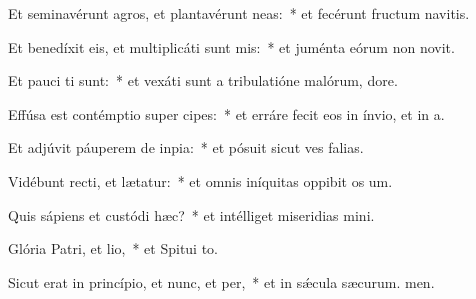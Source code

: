 \item Et seminavérunt agros, et plantavérunt neas:~* et fecérunt fructum navitis.
\item Et benedíxit eis, et multiplicáti sunt mis:~* et juménta eórum non novit.
\item Et pauci ti sunt:~* et vexáti sunt a tribulatióne malórum,  dore.
\item Effúsa est contémptio super cipes:~* et erráre fecit eos in ínvio, et  in a.
\item Et adjúvit páuperem de inpia:~* et pósuit sicut ves falias.
\item Vidébunt recti, et lætatur:~* et omnis iníquitas oppibit os um.
\item Quis sápiens et custódi hæc?~* et intélliget miseridias mini.
\item Glória Patri, et lio,~* et Spitui to.
\item Sicut erat in princípio, et nunc, et per,~* et in sǽcula sæcurum. men.
